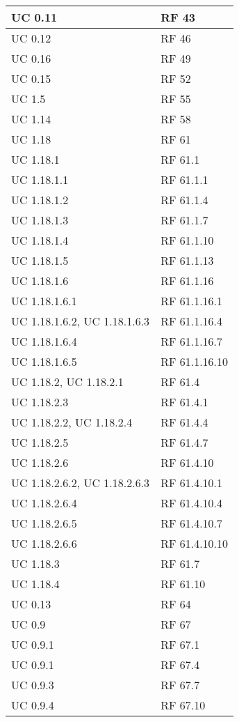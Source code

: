 {\begin{longtable} [c]{| p{4cm} | p{4cm} |}
 \hline 
UC 0.11 & RF 43\\ 
 \hline 
UC 0.12 & RF 46\\ 
 \hline 
UC 0.16 & RF 49\\ 
 \hline 
UC 0.15 & RF 52\\ 
 \hline 
UC 1.5 & RF 55\\ 
 \hline 
UC 1.14 & RF 58\\ 
 \hline 
UC 1.18 & RF 61\\ 
 \hline 
UC 1.18.1 & RF 61.1\\ 
 \hline 
UC 1.18.1.1 & RF 61.1.1\\ 
 \hline 
UC 1.18.1.2 & RF 61.1.4\\ 
 \hline 
UC 1.18.1.3 & RF 61.1.7\\ 
 \hline 
UC 1.18.1.4 & RF 61.1.10\\ 
 \hline 
UC 1.18.1.5 & RF 61.1.13\\ 
 \hline 
UC 1.18.1.6 & RF 61.1.16\\ 
 \hline 
UC 1.18.1.6.1 & RF 61.1.16.1\\ 
 \hline 
UC 1.18.1.6.2, UC 1.18.1.6.3 & RF 61.1.16.4\\ 
 \hline 
UC 1.18.1.6.4 & RF 61.1.16.7\\ 
 \hline 
UC 1.18.1.6.5 & RF 61.1.16.10\\ 
 \hline 
UC 1.18.2, UC 1.18.2.1 & RF 61.4\\ 
 \hline 
UC 1.18.2.3 & RF 61.4.1\\ 
 \hline 
UC 1.18.2.2, UC 1.18.2.4 & RF 61.4.4\\ 
 \hline 
UC 1.18.2.5 & RF 61.4.7\\ 
 \hline 
UC 1.18.2.6 & RF 61.4.10\\ 
 \hline 
UC 1.18.2.6.2, UC 1.18.2.6.3 & RF 61.4.10.1\\ 
 \hline 
UC 1.18.2.6.4 & RF 61.4.10.4\\ 
 \hline 
UC 1.18.2.6.5 & RF 61.4.10.7\\ 
 \hline 
UC 1.18.2.6.6 & RF 61.4.10.10\\ 
 \hline 
UC 1.18.3 & RF 61.7\\ 
 \hline 
UC 1.18.4 & RF 61.10\\ 
 \hline 
UC 0.13 & RF 64\\ 
 \hline 
UC 0.9 & RF 67\\ 
 \hline 
UC 0.9.1 & RF 67.1\\ 
 \hline 
UC 0.9.1 & RF 67.4\\ 
 \hline 
UC 0.9.3 & RF 67.7\\ 
 \hline 
UC 0.9.4 & RF 67.10\\ 

\end{longtable}}
